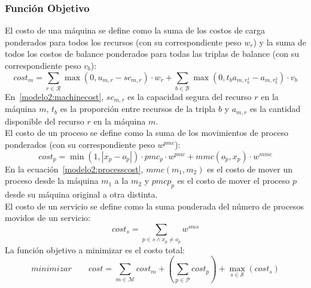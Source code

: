 \documentclass[../informe2.tex]{subfiles}
\begin{document}
\subsubsection{Función Objetivo}
El costo de una máquina se define como la suma de los costos de carga ponderados para todos los recursos (con su correspondiente peso $w_r$) y la suma de todos los costos de balance ponderados  para todas las triplas de balance (con su correspondiente peso $v_b$):
\begin{equation}\label{modelo2:machinecost}
	cost_m = \sum_{r \in \mathcal{R}}\max(0,u_{m,r}-sc_{m,r})\cdot w_r + \sum_{b \in \mathcal{B}}\max(0,t_ba_{m,r_{b}^1} - a_{m,r_{b}^2})\cdot v_b
\end{equation}
En~\eqref{modelo2:machinecost}, $sc_{m,r}$ es la capacidad segura del recurso $r$ en la máquina $m$, $t_b$ es la proporción entre recursos de la tripla $b$ y $a_{m,r}$ es la cantidad disponible del recurso $r$ en la máquina $m$. \\
El costo de un proceso se define como la suma de los movimientos de proceso ponderados (con su correspondiente peso $w^{pmc}$):
\begin{equation}\label{modelo2:processcost}
	cost_p = \min(1,|x_p - o_p|)\cdot pmc_p\cdot w^{pmc} + mmc(o_p,x_p)\cdot w^{mmc}
\end{equation}
En la ecuación~\eqref{modelo2:processcost}, $mmc(m_1,m_2)$ es el costo de mover un proceso desde la máquina $m_1$ a la $m_2$ y $pmcp_p$ es el costo de mover el proceso $p$ desde su máquina original a otra distinta.\\
El costo de un servicio se define como la suma ponderada del número de procesos movidos de un servicio:
\begin{equation}\label{modelo2:servicecost}
	cost_s = \sum_{p \in s \wedge x_p \neq o_p}w^{sms}
\end{equation}
La función objetivo a minimizar es el costo total:
\begin{equation}\label{modelo2:overallcost}
	minimizar \qquad cost = \sum_{m \in \mathcal{M}}cost_m + (\sum_{p \in \mathcal{P}}cost_p) + \max\limits_{s \in \mathcal{S}}(cost_s)
\end{equation}
\end{document}

